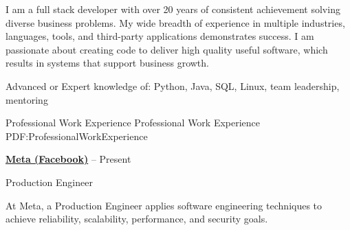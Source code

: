 \documentclass[letterpaper,MMMMyyyy,nonstopmode]{simpleresumecv}
\newif\ifLOCATION
\begin{document}
\begin{Body}
I am a full stack developer with over 20 years of consistent achievement solving diverse business problems. 
My wide breadth of experience in multiple industries, languages, tools, and third-party applications demonstrates success. 
I am passionate about creating code to deliver high quality useful software, which results in systems that support business growth.
\iffalse
\Entry
Full Stack/Backend Java architect, developer, and consultant, specializing in Java/Oracle/JavaScript
solutions and integrations.
\fi
\Gap
Advanced or Expert knowledge of: Python, Java, SQL, Linux, team leadership, mentoring
\iffalse
\Gap
\textit{Business Specialties}: Agile team leadership, customer-focused development, mentoring, requirements gathering and analysis, technical liaison, systems integration, business intelligence
\fi

\Section
{Professional\newline
Work Experience}
{Professional Work Experience}
{PDF:ProfessionalWorkExperience}

\Entry
\href{https://engineering.fb.com/category/production-engineering/}
{\textbf{Meta (Facebook)}}
\hfill
{} --
Present

Production Engineer 
\ifLOCATION
\hfill 
Remote in Rochester, New York
\fi

\begin{Detail}

At Meta, a Production Engineer applies software engineering techniques to achieve reliability, scalability, performance, and security goals.


\end{Detail}
\end{Body}
\end{document}
